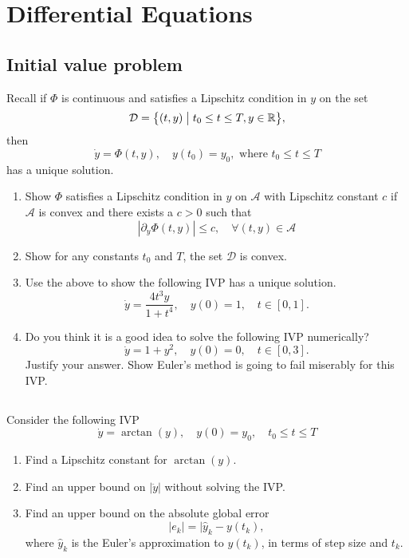 \chapter{Differential Equations}

\section{Initial value problem}
Recall if \(\Phi\) is continuous and satisfies a Lipschitz condition in \(y\) on the set
\[ \mathcal{D} = \Set{(t, y)}{t_0 \leq t \leq T, y\in\R}, \]
then
\[ \dot{y} = \Phi(t, y), \quad  y(t_0) = y_0, \text{ where } t_0 \leq t \leq T \]
has a unique solution.
\begin{enumerate}
	\item Show \(\Phi\) satisfies a Lipschitz condition in \(y\) on \(\mathcal{A}\) with Lipschitz constant \(c\) if \(\mathcal{A}\) is convex and there exists a \(c > 0\) such that
	\[ \left|\partial_{y}\Phi(t,y)\right|\leq c, \quad \forall (t,y)\in\mathcal{A} \]
	\item Show for any constants \(t_0\) and \(T\), the set \(\mathcal{D}\) is convex.
	\item Use the above to show the following IVP has a unique solution.
	\[ \dot{y}=\frac{4t^3y}{1+t^4}, \quad y(0)=1, \quad t\in[0,1]. \]
	\item Do you think it is a good idea to solve the following IVP numerically?
	\[ \dot{y}=1+y^2, \quad y(0)=0, \quad t\in[0,3]. \]
	Justify your answer.
	Show Euler's method is going to fail miserably for this IVP.
\end{enumerate}


\section{}
Consider the following IVP
\[ \dot{y} = \arctan(y), \quad y(0) = y_0, \quad t_0\leq t\leq T \]
\begin{enumerate}
	\item Find a Lipschitz constant for \(\arctan(y)\).
	\item Find an upper bound on \(|\ddot{y}|\) without solving the IVP.
	\item Find an upper bound on the absolute global error
	\[ |e_k|=|\hat{y}_k-y(t_k), \]
	where \(\hat{y}_k\) is the Euler's approximation to \(y(t_k)\), in terms of step size and \(t_k\).
\end{enumerate}


